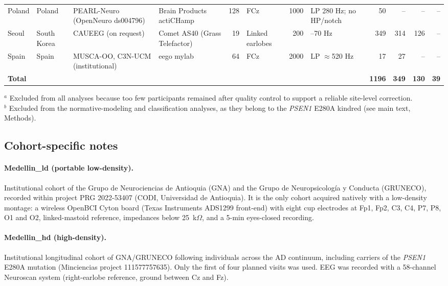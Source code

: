 \documentclass[11pt]{article}
\begin{document}
\begin{landscape}
\begin{table}[p]
\begin{tabularx}{\linewidth}{@{}l l >{\raggedright\arraybackslash}X >{\raggedright\arraybackslash}X r l r >{\raggedright\arraybackslash}X r r r r@{}}
Poland & Poland & PEARL-Neuro \cite{Dzianok2024} (OpenNeuro ds004796) & Brain Products actiCHamp & 128 & FCz & 1000 & LP 280 Hz; no HP/notch & 50 & -- & -- & -- \\
Seoul & South Korea & CAUEEG \cite{KimCAUEEG2023} (on request) & Comet AS40 (Grass Telefactor) & 19 & Linked earlobes & 200 & 0.5--70 Hz & 349 & 314 & 126 & -- \\
Spain & Spain & MUSCA-OO, C3N-UCM (institutional) & eego mylab & 64 & FCz & 2000 & LP $\approx$520 Hz & 17 & 27 & -- & -- \\
\midrule
\textbf{Total} & & & & & & & & \textbf{1196} & \textbf{349} & \textbf{130} & \textbf{39} \\
\bottomrule
\end{tabularx}

\vspace{4pt}
\raggedright\scriptsize
$^{a}$ Excluded from all analyses because too few participants remained after quality control to support a reliable site-level correction.\\
$^{b}$ Excluded from the normative-modeling and classification analyses, as they belong to the \textit{PSEN1} E280A kindred (see main text, Methods).
\end{table}
\end{landscape}

\subsection{Cohort-specific notes}

\paragraph{Medellin\_ld (portable low-density).}
Institutional cohort of the Grupo de Neurociencias de Antioquia (GNA) and the Grupo de Neuropsicolog\'ia y Conducta (GRUNECO), recorded within project PRG 2022-53407 (CODI, Universidad de Antioquia). It is the only cohort acquired natively with a low-density montage: a wireless OpenBCI Cyton board (Texas Instruments ADS1299 front-end) with eight cup electrodes at Fp1, Fp2, C3, C4, P7, P8, O1 and O2, linked-mastoid reference, impedances below 25~k$\Omega$, and a 5-min eyes-closed recording.

\paragraph{Medellin\_hd (high-density).}
Institutional longitudinal cohort of GNA/GRUNECO following individuals across the AD continuum, including carriers of the \textit{PSEN1} E280A mutation (Minciencias project 111577757635). Only the first of four planned visits was used. EEG was recorded with a 58-channel Neuroscan system (right-earlobe reference, ground between Cz and Fz).
\end{document}
